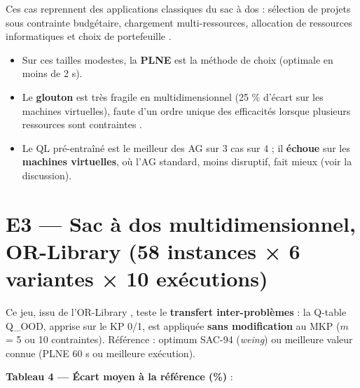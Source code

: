 \documentclass[
  french,
  11pt,
  a4paper,
]{article}
\providecommand{\tightlist}{%
  \setlength{\itemsep}{0pt}\setlength{\parskip}{0pt}}
\begin{document}
Ces cas reprennent des applications classiques du sac à dos : sélection
de projets sous contrainte budgétaire, chargement multi-ressources,
allocation de ressources informatiques et choix de portefeuille
\autocite{kellerer_knapsack_book_2004,vaezi_mean-var_2020,wilbaut_knapsack_2022}.

\begin{itemize}
\tightlist
\item
  Sur ces tailles modestes, la \textbf{PLNE} est la méthode de choix
  (optimale en moins de 2 s).
\item
  Le \textbf{glouton} est très fragile en multidimensionnel (25 \%
  d'écart sur les machines virtuelles), faute d'un ordre unique des
  efficacités lorsque plusieurs ressources sont contraintes
  \autocite{kellerer_multidimensional_2004}.
\item
  Le QL pré-entraîné est le meilleur des AG sur 3 cas sur 4 ; il
  \textbf{échoue} sur les \textbf{machines virtuelles}, où l'AG
  standard, moins disruptif, fait mieux (voir la discussion).
\end{itemize}

\section{E3 --- Sac à dos multidimensionnel, OR-Library (58 instances ×
6 variantes × 10
exécutions)}\label{analyse_resultats-e3-sac-uxe0-dos-multidimensionnel-or-library-58-instances-6-variantes-10-exuxe9cutions}

Ce jeu, issu de l'OR-Library
\autocite{beasley_orlib_1990,chu_beasley_1998}, teste le
\textbf{transfert inter-problèmes} : la Q-table Q\_OOD, apprise sur le
KP 0/1, est appliquée \textbf{sans modification} au MKP (\(m\) = 5 ou 10
contraintes). Référence : optimum SAC-94 (\emph{weing}) ou meilleure
valeur connue (PLNE 60 s ou meilleure exécution).

\textbf{Tableau 4 --- Écart moyen à la référence (\%)} :
\end{document}
